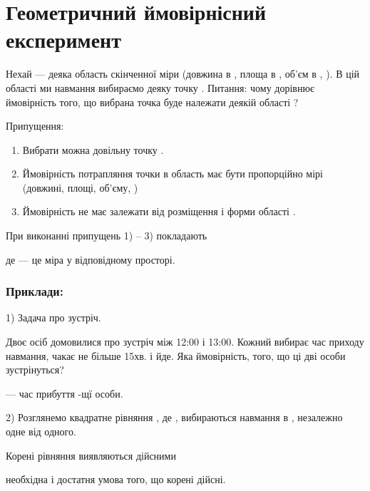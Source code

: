 \chapter{Геометричний ймовірнісний експеримент}

\begin{problem}
    Нехай  --- деяка область скінченної міри (довжина в , площа в ,
    об'єм в , ). В цій області ми навмання вибираємо деяку точку  .
    Питання: чому дорівнює ймовірність того, що вибрана точка буде
    належати деякій області ? 
\end{problem}

Припущення:

\begin{enumerate}
    \item Вибрати можна довільну точку .
    \item Ймовірність потрапляння точки в область
    має бути пропорційно мірі  (довжині, площі, об'єму,  )

    \item Ймовірність не має залежати від розміщення і форми
    області .
\end{enumerate}

При виконанні припущень 1) -- 3) покладають



де  --- це міра у відповідному просторі.

\subsection*{Приклади:}

1) Задача про зустріч.

Двоє осіб домовилися про зустріч між 12:00 і 13:00. Кожний
вибирає час приходу навмання, чакає не більше 15хв. і йде.
Яка ймовірність, того, що ці дві особи зустрінуться?

--- час прибуття  -щї особи.



2) Розглянемо квадратне рівняння  , де , вибираються
навмання в , незалежно одне від одного.

Корені рівняння виявляються дійсними

необхідна і достатня умова того, що корені дійсні.


